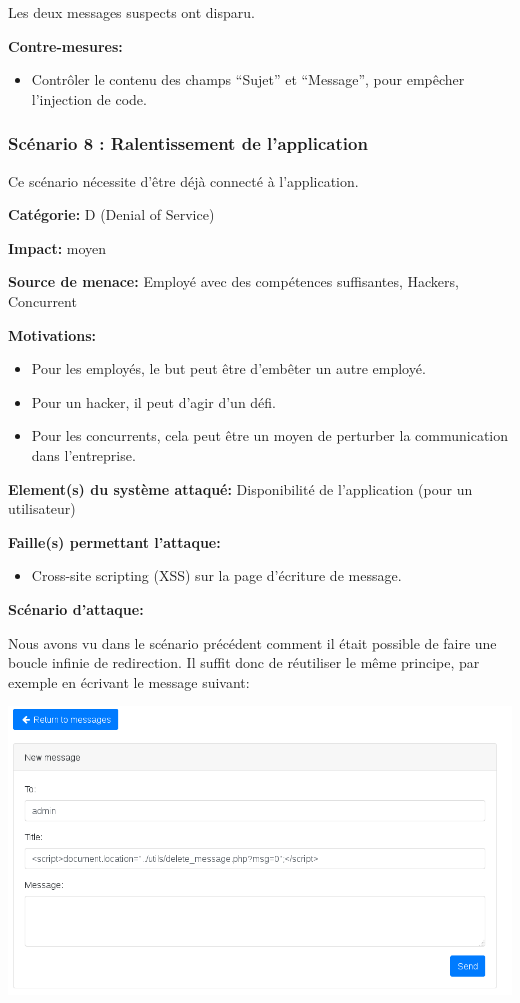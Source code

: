 \documentclass{article}
\begin{document}
Les deux messages suspects ont disparu.

\textbf{Contre-mesures:}

\begin{itemize}
\tightlist
\item
  Contrôler le contenu des champs ``Sujet'' et ``Message'', pour
  empêcher l'injection de code.
\end{itemize}

\hypertarget{scuxe9nario-8-ralentissement-de-lapplication}{%
\subsubsection{Scénario 8 : Ralentissement de
l'application}\label{scuxe9nario-8-ralentissement-de-lapplication}}

Ce scénario nécessite d'être déjà connecté à l'application.

\textbf{Catégorie:} D (Denial of Service)

\textbf{Impact:} moyen

\textbf{Source de menace:} Employé avec des compétences suffisantes,
Hackers, Concurrent

\textbf{Motivations:}

\begin{itemize}
\tightlist
\item
  Pour les employés, le but peut être d'embêter un autre employé.
\item
  Pour un hacker, il peut d'agir d'un défi.
\item
  Pour les concurrents, cela peut être un moyen de perturber la
  communication dans l'entreprise.
\end{itemize}

\textbf{Element(s) du système attaqué:} Disponibilité de l'application
(pour un utilisateur)

\textbf{Faille(s) permettant l'attaque:}

\begin{itemize}
\tightlist
\item
  Cross-site scripting (XSS) sur la page d'écriture de message.
\end{itemize}

\textbf{Scénario d'attaque:}

Nous avons vu dans le scénario précédent comment il était possible de
faire une boucle infinie de redirection. Il suffit donc de réutiliser le
même principe, par exemple en écrivant le message suivant:

\includegraphics{images/loop1.PNG}
\end{document}
